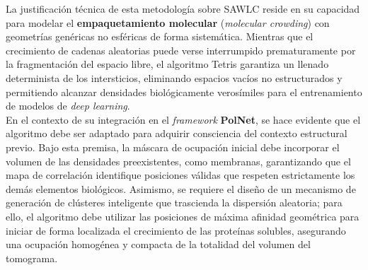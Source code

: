 La justificación técnica de esta metodología sobre SAWLC reside en su capacidad para modelar el \textbf{empaquetamiento molecular} (\textit{molecular crowding}) con geometrías genéricas no esféricas de forma sistemática. Mientras que el crecimiento de cadenas aleatorias puede verse interrumpido prematuramente por la fragmentación del espacio libre, el algoritmo Tetris garantiza un llenado determinista de los intersticios, eliminando espacios vacíos no estructurados y permitiendo alcanzar densidades biológicamente verosímiles para el entrenamiento de modelos de \textit{deep learning}.\\

En el contexto de su integración en el \textit{framework} \textbf{PolNet}, se hace evidente que el algoritmo debe ser adaptado para adquirir consciencia del contexto estructural previo. Bajo esta premisa, la máscara de ocupación inicial debe incorporar el volumen de las densidades preexistentes, como membranas, garantizando que el mapa de correlación identifique posiciones válidas que respeten estrictamente los demás elementos biológicos. Asimismo, se requiere el diseño de un mecanismo de generación de clústeres inteligente que trascienda la dispersión aleatoria; para ello, el algoritmo debe utilizar las posiciones de máxima afinidad geométrica para iniciar de forma localizada el crecimiento de las proteínas solubles, asegurando una ocupación homogénea y compacta de la totalidad del volumen del tomograma.


